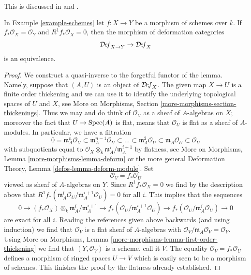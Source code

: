 \begin{lemma}
\label{lemma-schemes-morphisms-smooth-to-base}
\begin{reference}
This is discussed in \cite[Section 5.3]{Ravi-Murphys-Law} and
\cite[Theorem 3.3]{Ran-deformations}.
\end{reference}
In Example \ref{example-schemes} let $f : X \to Y$ be a morphism of schemes
over $k$. If $f_*\mathcal{O}_X = \mathcal{O}_Y$ and $R^1f_*\mathcal{O}_X = 0$,
then the morphism of deformation categories
$$
\mathcal{D}\!\mathit{ef}_{X \to Y} \to \mathcal{D}\!\mathit{ef}_X
$$
is an equivalence.
\end{lemma}

\begin{proof}
We construct a quasi-inverse to the forgetful functor of the lemma.
Namely, suppose that $(A, U)$ is an object of $\mathcal{D}\!\mathit{ef}_X$.
The given map $X \to U$ is a finite order thickening and we can use
it to identify the underlying topological spaces of $U$ and $X$, see
More on Morphisms, Section \ref{more-morphisms-section-thickenings}.
Thus we may and do think of $\mathcal{O}_U$ as a sheaf of
$A$-algebras on $X$; moreover the fact that $U \to \mathop{\mathrm{Spec}}(A)$ is
flat, means that $\mathcal{O}_U$ is flat as a sheaf of $A$-modules.
In particular, we have a filtration
$$
0 = \mathfrak m_A^n\mathcal{O}_U \subset
\mathfrak m_A^{n - 1}\mathcal{O}_U \subset \ldots \subset
\mathfrak m_A^2\mathcal{O}_U \subset
\mathfrak m_A\mathcal{O}_U \subset \mathcal{O}_U
$$
with subquotients equal to
$\mathcal{O}_X \otimes_k \mathfrak m_A^i/\mathfrak m_A^{i + 1}$
by flatness, see More on Morphisms, Lemma \ref{more-morphisms-lemma-deform}
or the more general Deformation Theory, Lemma \ref{defos-lemma-deform-module}.
Set
$$
\mathcal{O}_V = f_*\mathcal{O}_U
$$
viewed as sheaf of $A$-algebras on $Y$. Since
$R^1f_*\mathcal{O}_X = 0$ we find by the description above that
$R^1f_*(\mathfrak m_A^i\mathcal{O}_U/\mathfrak m_A^{i + 1}\mathcal{O}_U) = 0$
for all $i$. This implies that the sequences
$$
0 \to
(f_*\mathcal{O}_X) \otimes_k \mathfrak m_A^i/\mathfrak m_A^{i + 1} \to
f_*(\mathcal{O}_U/\mathfrak m_A^{i + 1}\mathcal{O}_U) \to
f_*(\mathcal{O}_U/\mathfrak m_A^i\mathcal{O}_U) \to 0
$$
are exact for all $i$. Reading the references given above backwards
(and using induction) we find that $\mathcal{O}_V$ is a flat
sheaf of $A$-algebras with
$\mathcal{O}_V/\mathfrak m_A\mathcal{O}_V = \mathcal{O}_Y$.
Using More on Morphisms, Lemma
\ref{more-morphisms-lemma-first-order-thickening}
we find that $(Y, \mathcal{O}_V)$ is a scheme, call it $V$.
The equality $\mathcal{O}_V = f_*\mathcal{O}_U$ defines a
morphism of ringed spaces $U \to V$ which is easily seen to be
a morphism of schemes. This finishes the proof by the
flatness already established.
\end{proof}







